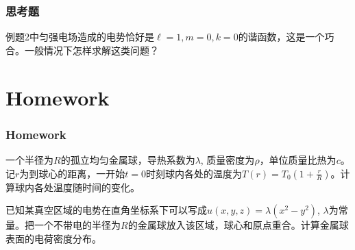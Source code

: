 \documentclass[CJK]{beamer}
\begin{document}
\begin{frame}
\frametitle{思考题}



例题2中匀强电场造成的电势恰好是$\ell = 1, m = 0, k=0$的谐函数，这是一个巧合。一般情况下怎样求解这类问题？

\end{frame}




\section{Homework}

\begin{frame}
\frametitle{Homework}

\bitem
\item{一个半径为$R$的孤立均匀金属球，导热系数为$\lambda$, 质量密度为$\rho$，单位质量比热为$c$。记$r$为到球心的距离，一开始$t=0$时刻球内各处的温度为$T(r) = T_0\left(1+\frac{r}{R}\right)$。计算球内各处温度随时间的变化。}
\item{已知某真空区域的电势在直角坐标系下可以写成$ u(x,y,z) = \lambda(x^2-y^2)$, $\lambda$为常量。把一个不带电的半径为$R$的金属球放入该区域，球心和原点重合。计算金属球表面的电荷密度分布。}
  
  \eitem

\end{frame}

\ech
\end{document}
